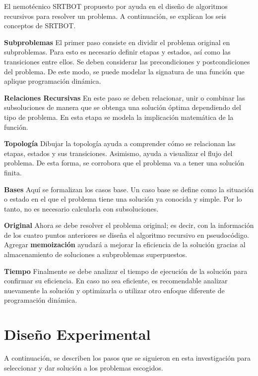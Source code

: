 \documentclass[a4paper, 12pt]{article}
\begin{document}
El nemotécnico SRTBOT propuesto por \citet{demaine2021} ayuda en el diseño de  algoritmos recursivos para resolver un problema. A continuación, se explican los seis conceptos de SRTBOT.

\textbf{Subproblemas} El primer paso consiste en dividir el problema original en subproblemas. Para esto es necesario definir etapas y estados, así como las transiciones entre ellos. Se deben considerar las precondiciones y postcondiciones del problema. De este modo, se puede modelar la signatura de una función que aplique programación dinámica.

\textbf{Relaciones Recursivas} En este paso se deben relacionar, unir o combinar las subsoluciones de manera que se obtenga una solución óptima dependiendo del tipo de problema. En esta etapa se modela la implicación matemática de la función.

\textbf{Topología} Dibujar la topología ayuda a comprender cómo se relacionan las etapas, estados y sus transiciones. Asimismo, ayuda a visualizar el flujo del problema. De esta forma, se corrobora que el problema va a tener una solución finita.

\textbf{Bases} Aquí se formalizan los casos base. Un caso base se define como la situación o estado en el que el problema tiene una solución ya conocida y simple. Por lo tanto, no es necesario calcularla con subsoluciones.

\textbf{Original} Ahora se debe resolver el problema original; es decir,
con la información de los cuatro puntos anteriores se diseña el algoritmo recursivo en pseudocódigo. Agregar {\bf memoización} ayudará a mejorar la eficiencia de la solución gracias al almacenamiento de soluciones a subproblemas superpuestos.

\textbf{Tiempo} Finalmente se debe analizar el tiempo de ejecución de la solución para confirmar su eficiencia. En caso no sea eficiente, es recomendable analizar nuevamente la solución y optimizarla o utilizar otro enfoque diferente de programación dinámica.

\section{Diseño Experimental}
\label{sc:DisExp}

A continuación, se describen los pasos que se siguieron en esta investigación para seleccionar y dar solución a los problemas escogidos.

\end{document}
